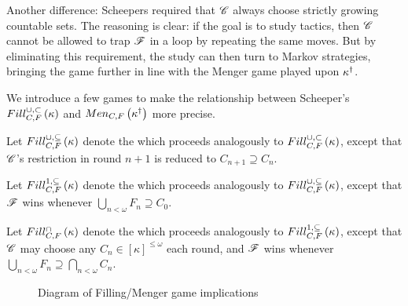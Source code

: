 Another difference: Scheepers required that $\mathscr{C}$ always choose strictly
growing countable sets. The reasoning is clear: if the goal is to study tactics,
then $\mathscr{C}$ cannot be allowed to trap $\mathscr{F}$ in a loop by repeating the same
moves. But by eliminating this requirement, the study can then turn to Markov
strategies, bringing the game further in line with the Menger game played upon
$\kappa^\dagger$.

We introduce a few games to make the relationship between Scheeper's
$Fill^{\cup,\subset}_{C,F}\left({\kappa}\right)$ and $Men_{C,F}\left({\kappa^\dagger}\right)$ more precise.

\begin{game}
  Let $Fill^{\cup,\subseteq}_{C,F}\left({\kappa}\right)$ denote the
   which proceeds analogously
  to $Fill^{\cup,\subset}_{C,F}\left({\kappa}\right)$, except that $\mathscr{C}$'s restriction in round $n+1$
  is reduced to $C_{n+1}\supseteq C_n$.
\end{game}

\begin{game}
  Let $Fill^{1,\subseteq}_{C,F}\left({\kappa}\right)$ denote the
   which proceeds analogously
  to $Fill^{\cup,\subseteq}_{C,F}\left({\kappa}\right)$, except that $\mathscr{F}$ wins whenever
  $\bigcup_{n<\omega}F_n\supseteq C_0$.
\end{game}

\begin{game}
  Let $Fill^{\cap}_{C,F}\left({\kappa}\right)$ denote the
   which proceeds analogously
  to $Fill^{1,\subseteq}_{C,F}\left({\kappa}\right)$, except that $\mathscr{C}$ may choose any
  $C_n\in[\kappa]^{\leq\omega}$ each round, and $\mathscr{F}$ wins whenever
  $\bigcup_{n<\omega}F_n\supseteq\bigcap_{n<\omega}C_n$.
\end{game}

\begin{figure}[h]
\begin{center}
\end{center}
\caption{Diagram of Filling/Menger game implications}
\label{fillingGamesDiagram}
\end{figure}

